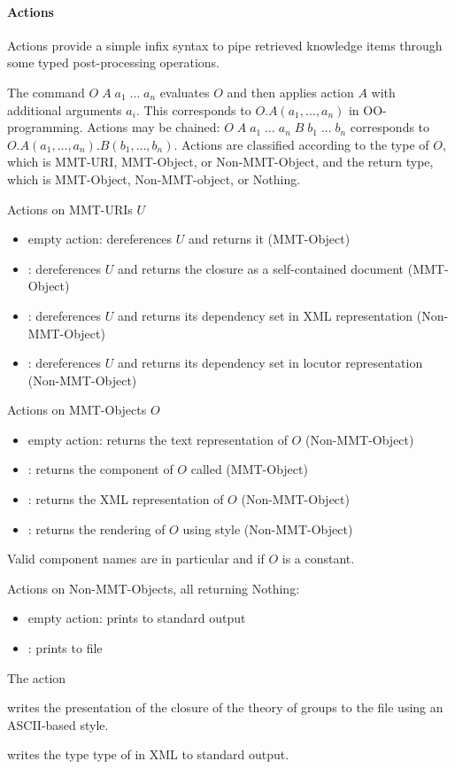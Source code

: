 \paragraph{Actions}
Actions provide a simple infix syntax to pipe retrieved knowledge items through some typed post-processing operations.

The command $O\;A\;a_1\;\ldots\;a_n$ evaluates $O$ and then applies action $A$ with additional arguments $a_i$. This corresponds to $O.A(a_1,\ldots,a_n)$ in OO-programming. Actions may be chained: $O\;A\;a_1\;\ldots\;a_n \;B\;b_1\;\ldots\;b_n$ corresponds to $O.A(a_1,\ldots,a_n).B(b_1,\ldots,b_n)$. Actions are classified according to the type of $O$, which is MMT-URI, MMT-Object, or Non-MMT-Object, and the return type, which is MMT-Object, Non-MMT-object, or Nothing.
\smallskip

\noindent
Actions on MMT-URIs $U$
\begin{itemize}
\item empty action: dereferences $U$ and returns it (MMT-Object)
\item {}: dereferences $U$ and returns the closure as a self-contained document (MMT-Object)
\item {}: dereferences $U$ and returns its dependency set in XML representation (Non-MMT-Object)
\item {}: dereferences $U$ and returns its dependency set in locutor representation (Non-MMT-Object)
\end{itemize}

\noindent
Actions on MMT-Objects $O$
\begin{itemize}
\item empty action: returns the text representation of $O$ (Non-MMT-Object)
\item {}: returns the component of $O$ called  (MMT-Object)
\item {}: returns the XML representation of $O$ (Non-MMT-Object)
\item {}: returns the rendering of $O$ using style  (Non-MMT-Object)
\end{itemize}
Valid component names  are in particular  and  if $O$ is a constant.


\noindent
Actions on Non-MMT-Objects, all returning Nothing:
\begin{itemize}
\item empty action: prints to standard output
\item {}: prints to file 
\end{itemize}

\begin{example}
The action

\noindent
{}
writes the presentation of the closure of the theory of groups to the file  using an ASCII-based style.

\noindent
{}
writes the type type of  in XML to standard output.
\end{example}